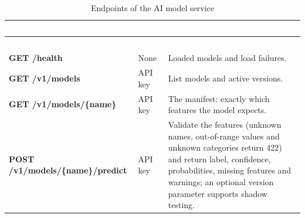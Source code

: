 {\tabfont\rowband
\begin{longtable}{@{}>{\raggedright\arraybackslash}p{}>{\raggedright\arraybackslash}p{}>{\raggedright\arraybackslash}p{}@{}}
\caption{Endpoints of the AI model service}\label{tab:ai-endpoints}\\
\rowcolor{najdanavy}\textcolor{white}{\sffamily\bfseries\small Endpoint} & \textcolor{white}{\sffamily\bfseries\small Auth} & \textcolor{white}{\sffamily\bfseries\small Purpose}\\
\endfirsthead
\rowcolor{najdanavy}\textcolor{white}{\sffamily\bfseries\small Endpoint} & \textcolor{white}{\sffamily\bfseries\small Auth} & \textcolor{white}{\sffamily\bfseries\small Purpose}\\
\endhead
\bottomrule\endlastfoot
\textbf{GET /\allowbreak{}health} & None & Loaded models and load failures.\\
\textbf{GET /\allowbreak{}v1/\allowbreak{}models} & API key & List models and active versions.\\
\textbf{GET /\allowbreak{}v1/\allowbreak{}models/\allowbreak{}\{name\}} & API key & The manifest: exactly which features the model expects.\\
\textbf{POST /\allowbreak{}v1/\allowbreak{}models/\allowbreak{}\{name\}/\allowbreak{}predict} & API key & Validate the features (unknown names, out-of-range values and unknown categories return 422) and return label, confidence, probabilities, missing features and warnings; an optional version parameter supports shadow testing.\\
\end{longtable}}
